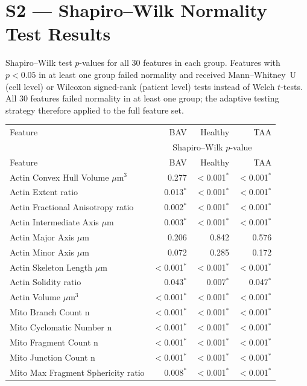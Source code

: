 \documentclass[11pt,a4paper]{article}
\begin{document}
\section*{S2 — Shapiro--Wilk Normality Test Results}
Shapiro--Wilk test $p$-values for all 30 features in each group.
Features with $p < 0.05$ in at least one group failed normality
and received Mann--Whitney~U (cell level) or Wilcoxon signed-rank (patient level)
tests instead of Welch $t$-tests. All 30 features failed normality in at least one
group; the adaptive testing strategy therefore applied to the full feature set.
\vspace{1em}
\begin{longtable}{lrrr}
\toprule
Feature & BAV & Healthy & TAA \\
 & \multicolumn{3}{c}{Shapiro--Wilk $p$-value} \\
\midrule\endfirsthead
\toprule Feature & BAV & Healthy & TAA\\\midrule\endhead
\bottomrule\endfoot
  Actin Convex Hull Volume $\mu$m$^{3}$ & 0.277 & $<$0.001$^{*}$ & $<$0.001$^{*}$ \\
  Actin Extent ratio & 0.013$^{*}$ & $<$0.001$^{*}$ & $<$0.001$^{*}$ \\
  Actin Fractional Anisotropy ratio & 0.002$^{*}$ & $<$0.001$^{*}$ & $<$0.001$^{*}$ \\
  Actin Intermediate Axis $\mu$m & 0.003$^{*}$ & $<$0.001$^{*}$ & $<$0.001$^{*}$ \\
  Actin Major Axis $\mu$m & 0.206 & 0.842 & 0.576 \\
  Actin Minor Axis $\mu$m & 0.072 & 0.285 & 0.172 \\
  Actin Skeleton Length $\mu$m & $<$0.001$^{*}$ & $<$0.001$^{*}$ & $<$0.001$^{*}$ \\
  Actin Solidity ratio & 0.043$^{*}$ & 0.007$^{*}$ & 0.047$^{*}$ \\
  Actin Volume $\mu$m$^{3}$ & $<$0.001$^{*}$ & $<$0.001$^{*}$ & $<$0.001$^{*}$ \\
  Mito Branch Count n & $<$0.001$^{*}$ & $<$0.001$^{*}$ & $<$0.001$^{*}$ \\
  Mito Cyclomatic Number n & $<$0.001$^{*}$ & $<$0.001$^{*}$ & $<$0.001$^{*}$ \\
  Mito Fragment Count n & $<$0.001$^{*}$ & $<$0.001$^{*}$ & $<$0.001$^{*}$ \\
  Mito Junction Count n & $<$0.001$^{*}$ & $<$0.001$^{*}$ & $<$0.001$^{*}$ \\
  Mito Max Fragment Sphericity ratio & 0.008$^{*}$ & $<$0.001$^{*}$ & $<$0.001$^{*}$ \\

\end{longtable}
\end{document}
